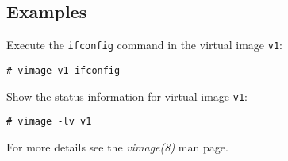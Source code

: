 \subsection{Examples}

Execute the \texttt{ifconfig} command in the virtual image \texttt{v1}:

\texttt{\# vimage v1 ifconfig}

Show the status information for virtual image \texttt{v1}:

\texttt{\# vimage -lv v1}

For more details see the \emph{vimage(8)} man page.

% 
% 
% 
